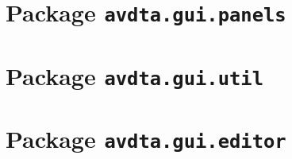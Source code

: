 \section{Package \texttt{avdta.gui.panels}}













\section{Package \texttt{avdta.gui.util}}
\label{api:util}



\section{Package \texttt{avdta.gui.editor}}